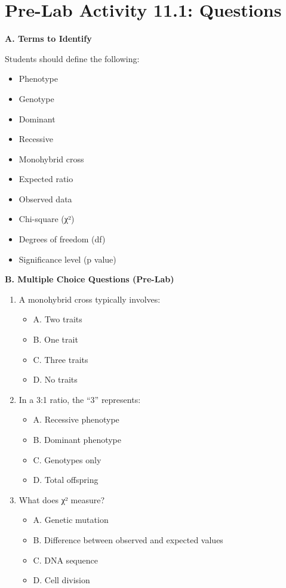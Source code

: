 \documentclass[
  letterpaper,
  DIV=11,
  numbers=noendperiod]{scrreprt}
\begin{document}
\section{\texorpdfstring{\textbf{Pre-Lab Activity 11.1:
Questions}}{Pre-Lab Activity 11.1: Questions}}\label{pre-lab-activity-11.1-questions}

\textbf{A. Terms to Identify}

Students should define the following:

\begin{itemize}
\item
  Phenotype
\item
  Genotype
\item
  Dominant
\item
  Recessive
\item
  Monohybrid cross
\item
  Expected ratio
\item
  Observed data
\item
  Chi-square (χ²)
\item
  Degrees of freedom (df)
\item
  Significance level (p value)
\end{itemize}

\textbf{B. Multiple Choice Questions (Pre-Lab)}

\begin{enumerate}
\def\labelenumi{\arabic{enumi}.}
\item
  A monohybrid cross typically involves:

  \begin{itemize}
  \item
    A. Two traits
  \item
    B. One trait
  \item
    C. Three traits
  \item
    D. No traits
  \end{itemize}
\item
  In a 3:1 ratio, the ``3'' represents:

  \begin{itemize}
  \item
    A. Recessive phenotype
  \item
    B. Dominant phenotype
  \item
    C. Genotypes only
  \item
    D. Total offspring
  \end{itemize}
\item
  What does χ² measure?

  \begin{itemize}
  \item
    A. Genetic mutation
  \item
    B. Difference between observed and expected values
  \item
    C. DNA sequence
  \item
    D. Cell division
  \end{itemize}
\end{enumerate}
\end{document}
